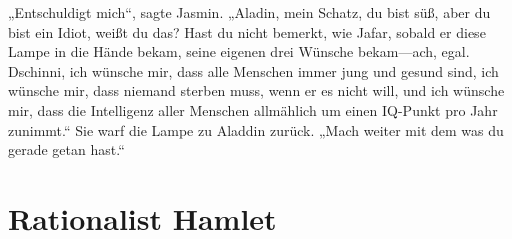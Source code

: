 „Entschuldigt mich“, sagte Jasmin.
„Aladin, mein Schatz, du bist süß, aber du bist ein Idiot, weißt du das? Hast du nicht bemerkt, wie Jafar, sobald er diese Lampe in die Hände bekam, seine eigenen drei Wünsche bekam—ach, egal. Dschinni, ich wünsche mir, dass alle Menschen immer jung und gesund sind, ich wünsche mir, dass niemand sterben muss, wenn er es nicht will, und ich wünsche mir, dass die Intelligenz aller Menschen allmählich um einen IQ-Punkt pro Jahr zunimmt.“ Sie warf die Lampe zu Aladdin zurück.
„Mach weiter mit dem was du gerade getan hast.“

\section{Rationalist Hamlet\protect\footnotemark}%

